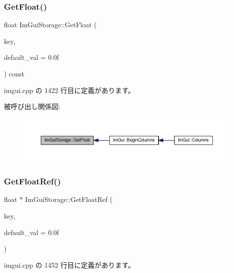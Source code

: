 \subsubsection{\texorpdfstring{Get\+Float()}{GetFloat()}}
{\footnotesize\ttfamily float Im\+Gui\+Storage\+::\+Get\+Float (\begin{DoxyParamCaption}\item[{\mbox{\hyperlink{imgui_8h_a1785c9b6f4e16406764a85f32582236f}{Im\+Gui\+ID}}}]{key,  }\item[{float}]{default\+\_\+val = {\ttfamily 0.0f} }\end{DoxyParamCaption}) const}



 imgui.\+cpp の 1422 行目に定義があります。

被呼び出し関係図\+:\nopagebreak
\begin{figure}[H]
\begin{center}
\leavevmode
\includegraphics[width=350pt]{struct_im_gui_storage_a0f51ef327f7e548d003b0e006967c1eb_icgraph}
\end{center}
\end{figure}
\mbox{\label{struct_im_gui_storage_a4b51cc8c92c65d4224af65a8ce7752ee}} 
\subsubsection{\texorpdfstring{Get\+Float\+Ref()}{GetFloatRef()}}
{\footnotesize\ttfamily float $\ast$ Im\+Gui\+Storage\+::\+Get\+Float\+Ref (\begin{DoxyParamCaption}\item[{\mbox{\hyperlink{imgui_8h_a1785c9b6f4e16406764a85f32582236f}{Im\+Gui\+ID}}}]{key,  }\item[{float}]{default\+\_\+val = {\ttfamily 0.0f} }\end{DoxyParamCaption})}



 imgui.\+cpp の 1452 行目に定義があります。

\mbox{\label{struct_im_gui_storage_ac86b64f5c69a15de6c6c326963eca64a}} 

